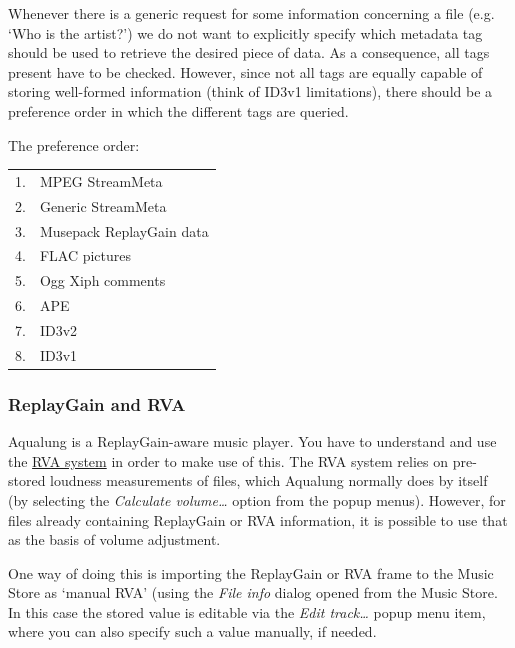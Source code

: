 \documentclass[10pt,english]{article}
\begin{document}
\noindent Whenever there is a generic request for some information
concerning a file (e.g. `Who is the artist?') we do not
want to explicitly specify which metadata tag should be used
to retrieve the desired piece of data. As a consequence, all
tags present have to be checked. However, since not all tags
are equally capable of storing well-formed information
(think of ID3v1 limitations), there should be a preference
order in which the different tags are queried.




The preference order:


\begin{center}\begin{tabular}{ll}

1.&
MPEG StreamMeta
\\

2.&
Generic StreamMeta
\\

3.&
Musepack ReplayGain data
\\

4.&
FLAC pictures
\\

5.&
Ogg Xiph comments
\\

6.&
APE
\\

7.&
ID3v2
\\

8.&
ID3v1
\\
\end{tabular}\end{center}



\subsubsection{ReplayGain and RVA\label{idp727104}}



\noindent Aqualung is a ReplayGain-aware music player. You have to
understand and use the \hyperref[idp645824]{\color{blue}RVA system} in
order to make use of this. The RVA system relies on
pre-stored loudness measurements of files, which Aqualung
normally does by itself (by selecting the \textsl{Calculate
volume\dots{}} option from the popup menus). However, for
files already containing ReplayGain or RVA information, it
is possible to use that as the basis of volume
adjustment.




One way of doing this is importing the ReplayGain or RVA
frame to the Music Store as `manual RVA' (using the
\textsl{File info} dialog opened from the Music Store. In
this case the stored value is editable via the \textsl{Edit
track\dots{}} popup menu item, where you can also specify
such a value manually, if needed.
\end{document}
